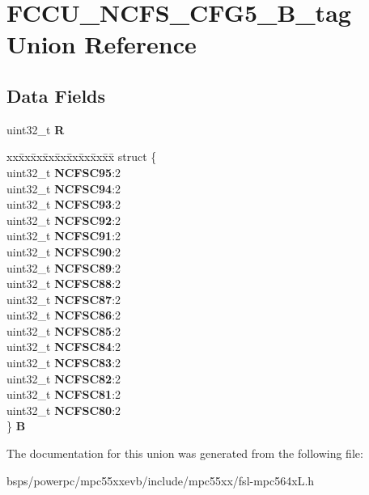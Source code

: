 \hypertarget{unionFCCU__NCFS__CFG5__32B__tag}{}\section{F\+C\+C\+U\+\_\+\+N\+C\+F\+S\+\_\+\+C\+F\+G5\+\_\+B\+\_\+tag Union Reference}
\label{unionFCCU__NCFS__CFG5__32B__tag}
\subsection*{Data Fields}
\begin{DoxyCompactItemize}
\item 
\mbox{\label{unionFCCU__NCFS__CFG5__32B__tag_ad2779449609db783ba71979eec0c27b5}} 
uint32\+\_\+t {\bfseries R}
\item 
\mbox{\label{unionFCCU__NCFS__CFG5__32B__tag_af167b5ce014525421718f7a581779348}} 
\begin{tabbing}
xx\=xx\=xx\=xx\=xx\=xx\=xx\=xx\=xx\=\kill
struct \{\\
\>uint32\_t {\bfseries NCFSC95}:2\\
\>uint32\_t {\bfseries NCFSC94}:2\\
\>uint32\_t {\bfseries NCFSC93}:2\\
\>uint32\_t {\bfseries NCFSC92}:2\\
\>uint32\_t {\bfseries NCFSC91}:2\\
\>uint32\_t {\bfseries NCFSC90}:2\\
\>uint32\_t {\bfseries NCFSC89}:2\\
\>uint32\_t {\bfseries NCFSC88}:2\\
\>uint32\_t {\bfseries NCFSC87}:2\\
\>uint32\_t {\bfseries NCFSC86}:2\\
\>uint32\_t {\bfseries NCFSC85}:2\\
\>uint32\_t {\bfseries NCFSC84}:2\\
\>uint32\_t {\bfseries NCFSC83}:2\\
\>uint32\_t {\bfseries NCFSC82}:2\\
\>uint32\_t {\bfseries NCFSC81}:2\\
\>uint32\_t {\bfseries NCFSC80}:2\\
\} {\bfseries B}\\

\end{tabbing}\end{DoxyCompactItemize}


The documentation for this union was generated from the following file\+:\begin{DoxyCompactItemize}
\item 
bsps/powerpc/mpc55xxevb/include/mpc55xx/fsl-\/mpc564x\+L.\+h\end{DoxyCompactItemize}
